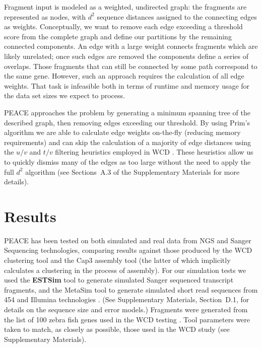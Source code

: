 \documentclass[a4,center,fleqn]{NAR}
\newcommand{\mc}[1]{#1}
\newcommand{\peace} {{\small PEACE}}
\newcommand{\wcd} {{\small WCD}}
\newcommand{\capthree} {{\small Cap3}}
\newcommand{\metasim} {{\small MetaSim}}
\begin{document}
Fragment input is modeled as a weighted, undirected graph: the
fragments are represented as nodes, with $d^2$ sequence distances
assigned to the connecting edges as weights.  Conceptually, we want to
remove each edge exceeding a threshold score from the complete graph
and define our partitions by the remaining connected components.  An
edge with a large weight connects fragments which are likely
unrelated; once such edges are removed the components define a series
of overlaps.  Those fragments that can still be connected by some path
correspond to the same gene.  However, such an approach requires the
calculation of all edge weights.  That task is infeasible both in terms
of runtime and memory usage for the data set sizes we expect to process.

\peace\/ approaches the problem by generating a minimum spanning tree of the
described graph, then removing edges exceeding our threshold.  By
using Prim's algorithm we are able to calculate edge weights
on-the-fly (reducing memory requirements) and can skip the
calculation of a majority of edge distances using the $u/v$ and $t/v$
filtering heuristics employed in \wcd\/ \cite{Hazelhurst08a}.
These heuristics allow us to quickly dismiss many of the edges as too
large without the need to apply the full $d^2$ algorithm (see
Sections~A.3 of the Supplementary Materials for more details). 

\section{Results}

\peace\/ has been tested on both simulated and real data from NGS and
Sanger Sequencing technologies, comparing results against those
produced by the \wcd\/ clustering tool \cite{Hazelhurst08a} and the
\capthree\/ assembly tool \cite{Huang99} (the latter of which
implicitly calculates a clustering in the process of assembly).
\mc{For our simulation tests we used the {\bf ESTSim} tool to generate
  simulated Sanger sequenced transcript fragments, and the \metasim\/
  tool to generate simulated short read sequences from 454 and Illumina
  technologies \cite{Hazelhurst03,Richter2008}.  (See Supplementary
  Materials, Section~D.1, for details on the sequence size and error
  models.)  Fragments were generated from the list of 100 zebra fish
  genes used in the \wcd\/ testing \cite{Hazelhurst08a}.  Tool
  parameters were taken to match, as closely as possible, those used
  in the \wcd\/ study (see Supplementary Materials).  }
\end{document}
